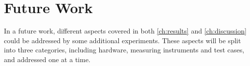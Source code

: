 \chapter{Future Work}\label{ch:future_work}

In a future work, different aspects covered in both \cref*{ch:results} and \cref*{ch:discussion} could be addressed by some additional experiments. These aspects will be split into three categories, including hardware, measuring instruments and test cases, and addressed one at a time.






